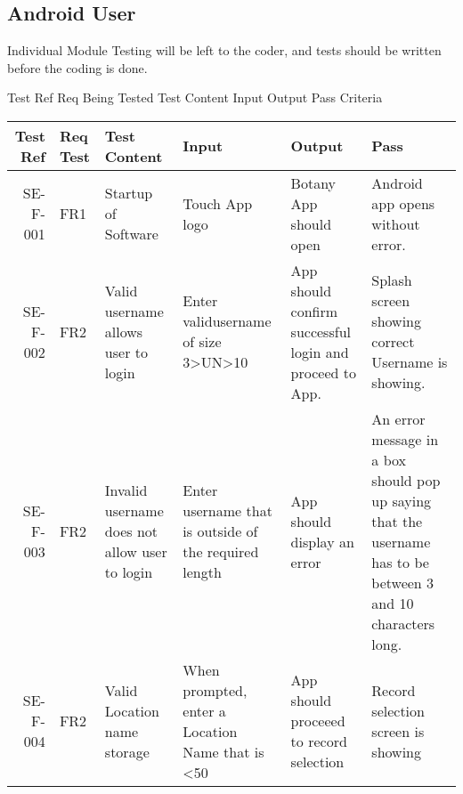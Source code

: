 \subsection{Android User}
	Individual Module Testing will be left to the coder, and tests should be written before the coding is done.

	Test Ref Req Being Tested Test Content Input Output Pass Criteria

	\begin{landscape}
		\begin{longtable}{|r|l|p{4cm}|p{4cm}|p{4cm}|p{4cm}|}
		\hline
		Test Ref & Req Test & Test Content & Input & Output & Pass \\ \hline
		SE-F-001 & FR1 & Startup of Software & Touch App logo & Botany App should open & Android app opens without error. \\ \hline
		SE-F-002 & FR2 & Valid username allows user to login & Enter validusername of size 3>UN>10 & App should confirm successful login and proceed to App. & Splash screen showing correct Username is showing. \\ \hline
		SE-F-003 & FR2 & Invalid username does not allow user to login & Enter username that is outside of the required length &  App should display an error & An error message in a box should pop up saying that the username has to be between 3 and 10 characters long.  \\ \hline
		SE-F-004 & FR2 & Valid Location name storage & When prompted, enter a Location Name that is <50 & App should proceeed to record selection & Record selection screen is showing \\ \hline
		

\end{longtable}
\end{landscape}
